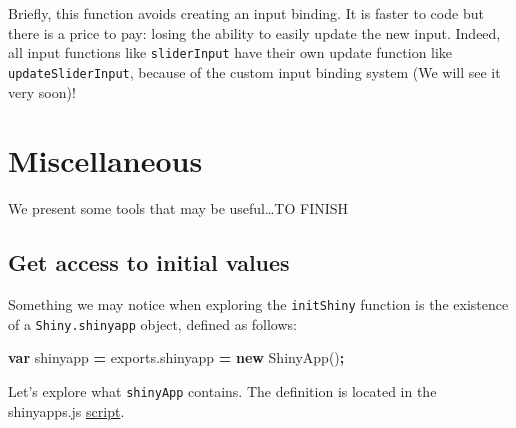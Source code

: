 \documentclass[
]{book}
\newenvironment{Shaded}{\begin{snugshade}}{\end{snugshade}}
\newcommand{\AttributeTok}[1]{\textcolor[rgb]{0.77,0.63,0.00}{#1}}
\newcommand{\KeywordTok}[1]{\textcolor[rgb]{0.13,0.29,0.53}{\textbf{#1}}}
\newcommand{\NormalTok}[1]{#1}
\newcommand{\OperatorTok}[1]{\textcolor[rgb]{0.81,0.36,0.00}{\textbf{#1}}}
\newcommand{\VariableTok}[1]{\textcolor[rgb]{0.00,0.00,0.00}{#1}}
\begin{document}
Briefly, this function avoids creating an input binding. It is faster to code but there is a price to pay: losing the ability to easily update the new input. Indeed, all input functions like \texttt{sliderInput} have their own update function like \texttt{updateSliderInput}, because of the custom input binding system (We will see it very soon)!

\hypertarget{miscellaneous}{%
\section{Miscellaneous}\label{miscellaneous}}

We present some tools that may be useful\ldots TO FINISH

\hypertarget{get-access-to-initial-values}{%
\subsection{Get access to initial values}\label{get-access-to-initial-values}}

Something we may notice when exploring the \texttt{initShiny} function is the existence of a \texttt{Shiny.shinyapp} object, defined as follows:

\begin{Shaded}
\begin{Highlighting}[]
\KeywordTok{var}\NormalTok{ shinyapp }\OperatorTok{=} \VariableTok{exports}\NormalTok{.}\AttributeTok{shinyapp} \OperatorTok{=} \KeywordTok{new} \AttributeTok{ShinyApp}\NormalTok{()}\OperatorTok{;}
\end{Highlighting}
\end{Shaded}

Let's explore what \texttt{shinyApp} contains. The definition is located in the shinyapps.js \href{https://github.com/rstudio/shiny/blob/master/srcjs/shinyapp.js}{script}.
\end{document}
